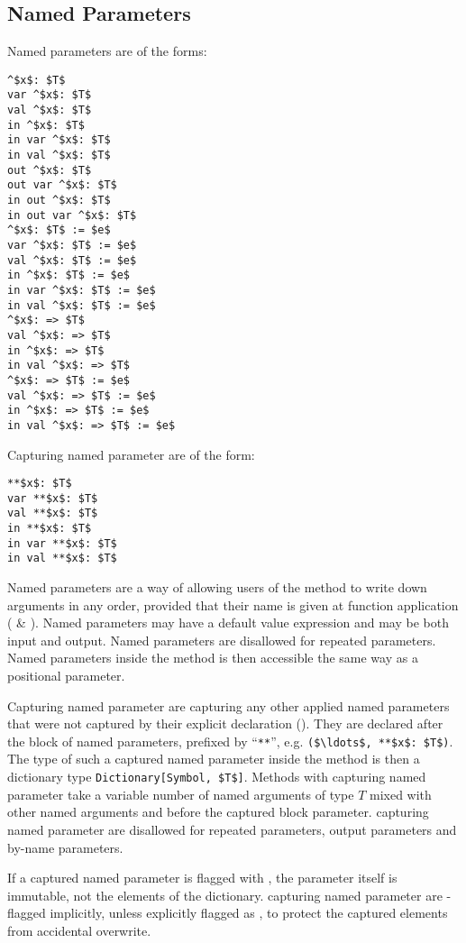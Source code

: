 \subsection{Named Parameters}
\label{sec:named-parameters}
\label{sec:capturing-named-parameter}

Named parameters are of the forms:
\begin{lstlisting}
^$x$: $T$
var ^$x$: $T$
val ^$x$: $T$
in ^$x$: $T$
in var ^$x$: $T$
in val ^$x$: $T$
out ^$x$: $T$
out var ^$x$: $T$
in out ^$x$: $T$
in out var ^$x$: $T$
^$x$: $T$ := $e$
var ^$x$: $T$ := $e$
val ^$x$: $T$ := $e$
in ^$x$: $T$ := $e$
in var ^$x$: $T$ := $e$
in val ^$x$: $T$ := $e$
^$x$: => $T$
val ^$x$: => $T$
in ^$x$: => $T$
in val ^$x$: => $T$
^$x$: => $T$ := $e$
val ^$x$: => $T$ := $e$
in ^$x$: => $T$ := $e$
in val ^$x$: => $T$ := $e$
\end{lstlisting}

Capturing named parameter are of the form: 
\begin{lstlisting}
**$x$: $T$
var **$x$: $T$
val **$x$: $T$
in **$x$: $T$
in var **$x$: $T$
in val **$x$: $T$
\end{lstlisting}

Named parameters are a way of allowing users of the method to write down arguments in any order, provided that their name is given at function application ( \& ). Named parameters may have a default value expression and may be both input and output. Named parameters are disallowed for repeated parameters. Named parameters inside the method is then accessible the same way as a positional parameter. 

Capturing named parameter are capturing any other applied named parameters that were not captured by their explicit declaration (). They are declared after the block of named parameters, prefixed by ``\lstinline!**!'', e.g. \lstinline!($\ldots$, **$x$: $T$)!. The type of such a captured named parameter inside the method is then a dictionary type \lstinline!Dictionary[Symbol, $T$]!. Methods with capturing named parameter take a variable number of named arguments of type $T$ mixed with other named arguments and before the captured block parameter. capturing named parameter are disallowed for repeated parameters, output parameters and by-name parameters. 

If a captured named parameter is flagged with , the parameter itself is immutable, not the elements of the dictionary. capturing named parameter are -flagged implicitly, unless explicitly flagged as , to protect the captured elements from accidental overwrite. 






